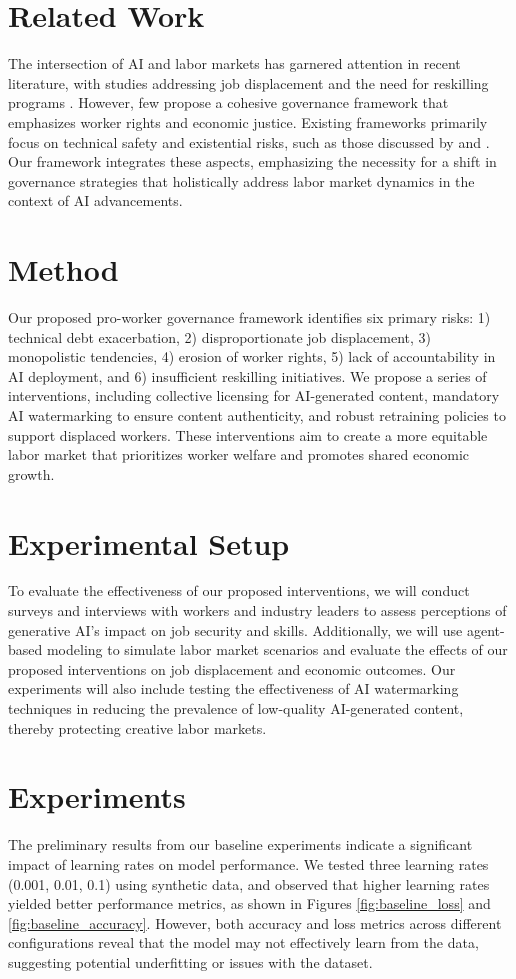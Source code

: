 \documentclass{article} %
\theoremstyle{plain}
\theoremstyle{definition}
\theoremstyle{remark}
\begin{document}
\section{Related Work}
The intersection of AI and labor markets has garnered attention in recent literature, with studies addressing job displacement and the need for reskilling programs \cite{maria2025artificialia, olaniyi2024dynamicsot}. However, few propose a cohesive governance framework that emphasizes worker rights and economic justice. Existing frameworks primarily focus on technical safety and existential risks, such as those discussed by \cite{hazra2025aiss} and \cite{kulveit2025gradualds}. Our framework integrates these aspects, emphasizing the necessity for a shift in governance strategies that holistically address labor market dynamics in the context of AI advancements.

\section{Method}
Our proposed pro-worker governance framework identifies six primary risks: 1) technical debt exacerbation, 2) disproportionate job displacement, 3) monopolistic tendencies, 4) erosion of worker rights, 5) lack of accountability in AI deployment, and 6) insufficient reskilling initiatives. We propose a series of interventions, including collective licensing for AI-generated content, mandatory AI watermarking to ensure content authenticity, and robust retraining policies to support displaced workers. These interventions aim to create a more equitable labor market that prioritizes worker welfare and promotes shared economic growth.

\section{Experimental Setup}
To evaluate the effectiveness of our proposed interventions, we will conduct surveys and interviews with workers and industry leaders to assess perceptions of generative AI's impact on job security and skills. Additionally, we will use agent-based modeling to simulate labor market scenarios and evaluate the effects of our proposed interventions on job displacement and economic outcomes. Our experiments will also include testing the effectiveness of AI watermarking techniques in reducing the prevalence of low-quality AI-generated content, thereby protecting creative labor markets.

\section{Experiments}
The preliminary results from our baseline experiments indicate a significant impact of learning rates on model performance. We tested three learning rates (0.001, 0.01, 0.1) using synthetic data, and observed that higher learning rates yielded better performance metrics, as shown in Figures \ref{fig:baseline_loss} and \ref{fig:baseline_accuracy}. However, both accuracy and loss metrics across different configurations reveal that the model may not effectively learn from the data, suggesting potential underfitting or issues with the dataset.
\end{document}
